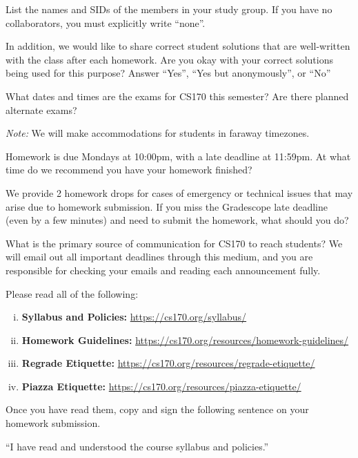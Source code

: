 \documentclass{article}
\begin{document}
List the names and SIDs of the members in your study group.
If you have no collaborators, you must explicitly write “none”.

In addition, we would like to share correct student solutions that are well-written with the class after each homework. 
Are you okay with your correct solutions being used for this purpose? Answer ``Yes'', ``Yes but anonymously'', or ``No''



\begin{subparts}
\subpart What dates and times are the exams for CS170 this semester? Are there planned alternate exams?

\textit{Note:} We will make accommodations for students in faraway timezones.

\subpart Homework is due Mondays at 10:00pm, with a late deadline at 11:59pm. At what time do we recommend you have your homework finished?

\subpart We provide 2 homework drops for cases of emergency or technical issues that may arise due to homework submission. 
If you miss the Gradescope late deadline (even by a few minutes) and need to submit the homework, what should you do?

\subpart What is the primary source of communication for CS170 to reach students? 
We will email out all important deadlines through this medium, and you are responsible for checking your emails and reading each announcement fully.

\subpart Please read all of the following: 

\begin{enumerate}[(i)]
\item \textbf{Syllabus and Policies:} \url{https://cs170.org/syllabus/}
\item \textbf{Homework Guidelines:} \url{https://cs170.org/resources/homework-guidelines/}
\item \textbf{Regrade Etiquette:} \url{https://cs170.org/resources/regrade-etiquette/}
\item \textbf{Piazza Etiquette:} \url{https://cs170.org/resources/piazza-etiquette/}
\end{enumerate}

Once you have read them, copy and sign the following sentence on your homework submission.

``I have read and understood the course syllabus and policies.''

\end{subparts}
\end{document}

